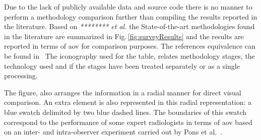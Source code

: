 Due to the lack of publicly available data and source code there is no manner to perform a methodology comparison further than compiling the results reported in the literature.
Based on \emph{******** et al.} the State-of-the-art methodologies found in the literature are summarized in Fig.\,\ref{fig:surveyResults} and the results are reported in terms of \ac{aov} for comparison purposes. The references equivalence can be found in~\cite{massich2013phd}
The iconography used for the table, relates methodology stages, the technology used and if the stages have been treated separately or as a single processing.

The figure, also arranges the information in a radial manner for direct visual comparison.
An extra element is also represented in this radial representation: a blue swatch delimited by two blue dashed lines.
The boundaries of this swatch correspond to the performance of some expert radiologists in terms of \ac{aov} based on an inter- and intra-observer experiment carried out by Pons et al.~\cite{gerard2013}.

